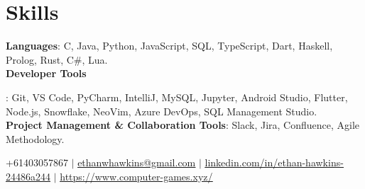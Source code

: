 \documentclass[letterpaper,11pt]{article}
\begin{document}
\section{Skills}
 \begin{itemize}[leftmargin=0.15in, label={}]
    \small{\item{
    \vspace{1mm}
     \textbf{Languages}{: C, Java, Python, JavaScript, SQL, TypeScript, Dart, Haskell, Prolog, Rust, C\#, Lua.} \\
     \vspace{1mm}
     \textbf{Developer Tools}{: Git, VS Code, PyCharm, IntelliJ, MySQL, Jupyter, Android Studio, Flutter, Node.js, Snowflake, NeoVim, Azure DevOps, SQL Management Studio. \\
     \textbf{Project Management \& Collaboration Tools}{: Slack, Jira, Confluence, Agile Methodology.} \\
     \vspace{1mm}

    }}
} \end{itemize}
 \begin{center}
    
\small +61403057867 $|$ 
\href{mailto:ADD EMAIL HERE@x.com}{\underline{ethanwhawkins@gmail.com}} $|$
\href{ADD LINKEDIN PAGE HERE}{\underline{linkedin.com/in/ethan-hawkins-24486a244}} 
$|$
\href{ADD LINKEDIN PAGE HERE}{\underline{https://www.computer-games.xyz/}} 

\end{center}
\end{document}
